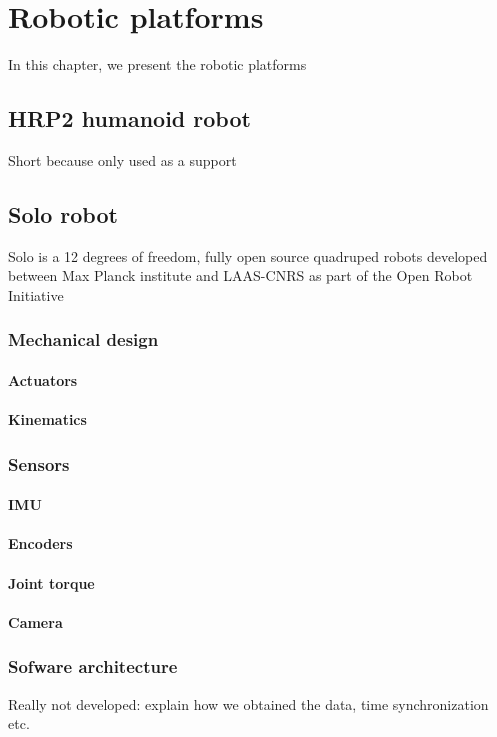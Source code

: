 \chapter{Robotic platforms}
In this chapter, we present the robotic platforms

\section{HRP2 humanoid robot}
Short because only used as a support

\section{Solo robot}
Solo is a 12 degrees of freedom, fully open source quadruped robots developed between Max Planck institute and LAAS-CNRS as part of the Open Robot Initiative 
\cite{grimminger2020open} 

\subsection{Mechanical design}
\subsubsection{Actuators}
\subsubsection{Kinematics}

\subsection{Sensors}
\subsubsection{IMU}
\subsubsection{Encoders}
\subsubsection{Joint torque}
\subsubsection{Camera}

\subsection{Sofware architecture}
Really not developed: explain how we obtained the data, time synchronization etc.

